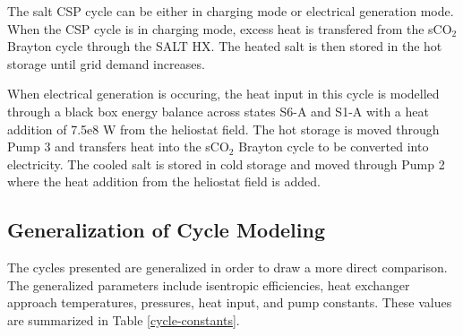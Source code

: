 \begin{paracol}{2}
\linenumbers
\switchcolumn

The salt CSP cycle can be either in charging mode or electrical generation mode. 
When the CSP cycle is in charging mode, excess heat is transfered from the sCO$_{2}$ Brayton cycle through the SALT HX. The heated salt is then stored in the hot storage until grid demand increases.   

When electrical generation is occuring, the heat input in this cycle is modelled through a black box energy balance across states S6-A and S1-A with a heat addition of 7.5e8 W from the heliostat field. The hot storage is moved through Pump 3 and transfers heat into the sCO$_{2}$ Brayton cycle to be converted into electricity. The cooled salt is stored in cold storage and moved through Pump 2 where the heat addition from the heliostat field is added.



\subsection{Generalization of Cycle Modeling}

The cycles presented are generalized in order to draw a more direct comparison. The generalized parameters include isentropic efficiencies, heat exchanger approach temperatures, pressures, heat input, and pump constants. These values are summarized in Table \ref{cycle-constants}.



\end{paracol}
